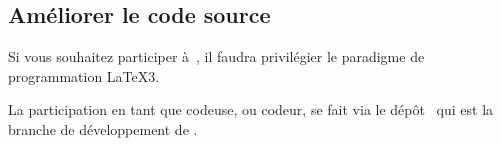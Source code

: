 \documentclass{../main/main}
\begin{document}

\subsection{Améliorer le code source}

\begin{tdocimp}
    Si vous souhaitez participer à \thisproj\,, il faudra privilégier le paradigme de programmation \LaTeX3.
\end{tdocimp}


La participation en tant que codeuse, ou codeur, se fait via le dépôt \thisrepo\ qui est la branche de développement de \thisrepo.
\end{document}
